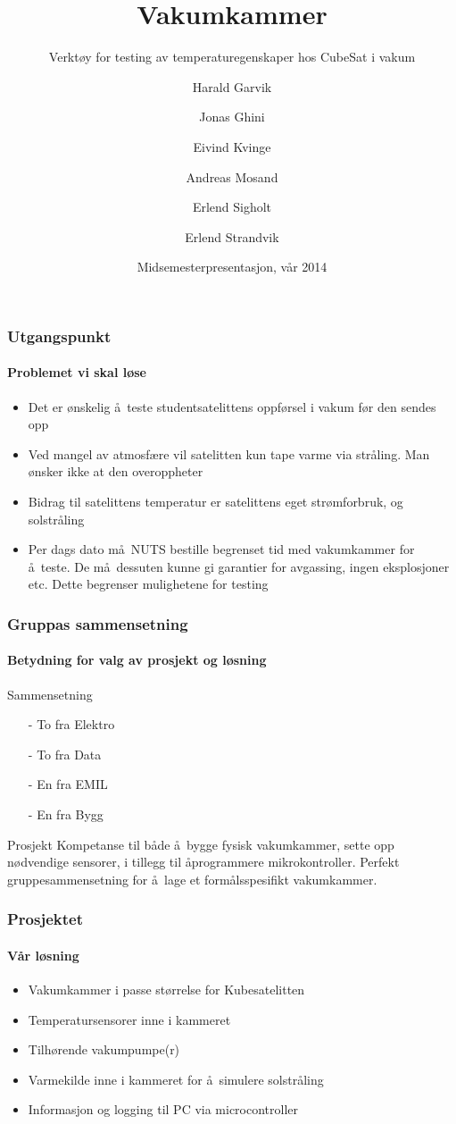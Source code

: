 \documentclass{beamer}
\title[Vakumkammer] %
{Vakumkammer}
\subtitle{Verkt\o y for testing av temperaturegenskaper hos CubeSat i vakum}
\author[Gruppe 1, TFE4850] %
{Harald Garvik  \and Jonas Ghini \and Eivind Kvinge \\ \and Andreas Mosand \and Erlend Sigholt \and Erlend Strandvik}
\date[2014] %
{Midsemesterpresentasjon, v\aa r 2014}
\begin{document}
  \frame{\titlepage}
  \begin{frame}
    \frametitle{Utgangspunkt}
    \framesubtitle{Problemet vi skal l\o se}
    \begin{itemize}%
    	\item Det er \o nskelig \aa\ teste studentsatelittens oppf\o rsel i vakum f\o r den sendes opp
    	\item Ved mangel av atmosf\ae re vil satelitten kun tape varme via str\aa ling. Man \o nsker ikke at den overoppheter
    	\item Bidrag til satelittens temperatur er satelittens eget str\o mforbruk, og solstr\aa ling
    	\item Per dags dato m\aa\ NUTS bestille begrenset tid med vakumkammer for \aa\ teste. De m\aa\ dessuten kunne gi garantier for avgassing, ingen eksplosjoner etc. Dette begrenser mulighetene for testing 
    \end{itemize}
  \end{frame}
  \begin{frame}
    \frametitle{Gruppas sammensetning}
    \framesubtitle{Betydning for valg av prosjekt og l\o sning}
    		\begin{block}{Sammensetning}
    		\begin{itemize}
    			\item[-] To fra Elektro
    			\item[-] To fra Data
    			\item[-] En fra EMIL
    			\item[-] En fra Bygg
    		\end{itemize}
    		\end{block}
    	\pause
    		\begin{block}{Prosjekt}
    		Kompetanse til b\aa de \aa\ bygge fysisk vakumkammer, sette opp
    		n\o dvendige sensorer, i tillegg til \aa programmere mikrokontroller.
    		\newline
    		\newline
    		Perfekt gruppesammensetning for \aa\ lage et form\aa lsspesifikt vakumkammer.
    		\end{block}
  \end{frame}
  \begin{frame}
    \frametitle{Prosjektet}
    \framesubtitle{V\aa r l\o sning}
    \begin{itemize}
    	\item Vakumkammer i passe st\o rrelse for Kubesatelitten
    	\item Temperatursensorer inne i kammeret
    	\item Tilh\o rende vakumpumpe(r)
    	\item Varmekilde inne i kammeret for \aa\ simulere solstr\aa ling
    	\item Informasjon og logging til PC via microcontroller
    \end{itemize}
  \end{frame}
\end{document}
